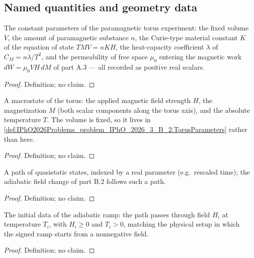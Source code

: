 \subsection*{Named quantities and geometry data}

\begin{definition}
\label{def:IPhO2026Problems_problem_IPhO_2026_3_B_2:TorusParameters}
The constant parameters of the paramagnetic torus experiment: the fixed
volume $V$, the amount of paramagnetic substance $n$, the Curie-type material
constant $K$ of the equation of state $T M V = n K H$, the heat-capacity
coefficient $\lambda$ of $C_M = n\lambda/T^2$, and the permeability of free
space $\mu_0$ entering the magnetic work $dW = \mu_0 V H\,dM$ of part A.3 ---
all recorded as positive real scalars.
\end{definition}
\begin{proof}
Definition; no claim.
\end{proof}

\begin{definition}
\label{def:IPhO2026Problems_problem_IPhO_2026_3_B_2:ParamagneticTorusState}
A macrostate of the torus: the applied magnetic field strength $H$, the
magnetization $M$ (both scalar components along the torus axis), and the
absolute temperature $T$.  The volume is fixed, so it lives in
\cref{def:IPhO2026Problems_problem_IPhO_2026_3_B_2:TorusParameters} rather
than here.
\end{definition}
\begin{proof}
Definition; no claim.
\end{proof}

\begin{definition}
\label{def:IPhO2026Problems_problem_IPhO_2026_3_B_2:StatePath}
A path of quasistatic states, indexed by a real parameter (e.g.\ rescaled
time); the adiabatic field change of part B.2 follows such a path.
\end{definition}
\begin{proof}
Definition; no claim.
\end{proof}

\begin{definition}
\label{def:IPhO2026Problems_problem_IPhO_2026_3_B_2:AdiabaticEndpoints}
The initial data of the adiabatic ramp: the path passes through field $H_i$
at temperature $T_i$, with $H_i \ge 0$ and $T_i > 0$, matching the physical
setup in which the signed ramp starts from a nonnegative field.
\end{definition}
\begin{proof}
Definition; no claim.
\end{proof}

